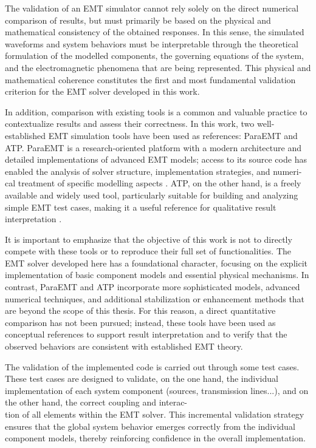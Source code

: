 The validation of an EMT simulator cannot rely solely on the direct numerical comparison of results, 
but must primarily be based on the physical and mathematical consistency of the obtained responses. 
In this sense, the simulated waveforms and system behaviors must be interpretable through the theoretical formulation of the modelled components, 
the governing equations of the system, and the electromagnetic phenomena that are being represented. 
This physical and mathematical coherence constitutes the first and most fundamental validation criterion for the EMT solver developed in this work.

In addition, comparison with existing tools is a common and valuable practice to contextualize results and assess their correctness. 
In this work, two well-established EMT simulation tools have been used as references: ParaEMT and ATP. 
ParaEMT is a research-oriented platform with a modern architecture and detailed implementations of advanced EMT models; 
access to its source code has enabled the analysis of solver structure, implementation strategies, and numeri-\\cal treatment of specific modelling aspects \cite{XiongParaETM2024}. 
ATP, on the other hand, is a freely available and widely used tool, particularly suitable for building and analyzing simple EMT test cases, 
making it a useful reference for qualitative result interpretation \cite{ATPManual}.

It is important to emphasize that the objective of this work is not to directly compete with these tools or to reproduce their full set of 
functionalities. The EMT solver developed here has a foundational character, focusing on the explicit implementation of basic component models 
and essential physical mechanisms. In contrast, ParaEMT and ATP incorporate more sophisticated models, advanced numerical techniques, 
and additional stabilization or enhancement methods that are beyond the scope of this thesis. For this reason, a direct quantitative comparison
has not been pursued; instead, these tools have been used as conceptual references to support result interpretation and to verify that the observed 
behaviors are consistent with established EMT theory.

The validation of the implemented code is carried out through some test cases. These test cases are designed to validate, on the one 
hand, the individual implementation of each system component (sources, transmission lines...), and on the other hand, 
the correct coupling and interac-\\tion of all elements within the EMT solver. This incremental validation strategy ensures that the global system 
behavior emerges correctly from the individual component models, thereby reinforcing confidence in the overall implementation.

